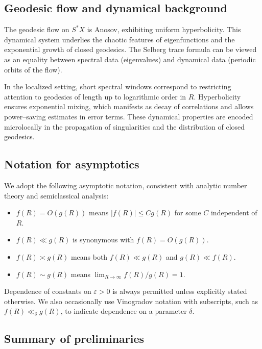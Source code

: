 \subsection{Geodesic flow and dynamical background}\label{subsec:flow}

The geodesic flow on $S^*X$ is Anosov, exhibiting uniform hyperbolicity. This dynamical system underlies the chaotic features of eigenfunctions and the exponential growth of closed geodesics. The Selberg trace formula can be viewed as an equality between spectral data (eigenvalues) and dynamical data (periodic orbits of the flow).

In the localized setting, short spectral windows correspond to restricting attention to geodesics of length up to logarithmic order in $R$. Hyperbolicity ensures exponential mixing, which manifests as decay of correlations and allows power–saving estimates in error terms. These dynamical properties are encoded microlocally in the propagation of singularities and the distribution of closed geodesics.

\subsection{Notation for asymptotics}\label{subsec:asymptotics}

We adopt the following asymptotic notation, consistent with analytic number theory and semiclassical analysis:

\begin{itemize}
  \item $f(R) = O(g(R))$ means $|f(R)| \le C g(R)$ for some $C$ independent of $R$.
  \item $f(R) \ll g(R)$ is synonymous with $f(R)=O(g(R))$.
  \item $f(R) \asymp g(R)$ means both $f(R) \ll g(R)$ and $g(R) \ll f(R)$.
  \item $f(R) \sim g(R)$ means $\lim_{R\to\infty} f(R)/g(R)=1$.
\end{itemize}

Dependence of constants on $\varepsilon>0$ is always permitted unless explicitly stated otherwise. We also occasionally use Vinogradov notation with subscripts, such as $f(R) \ll_\delta g(R)$, to indicate dependence on a parameter $\delta$.

\subsection{Summary of preliminaries}\label{subsec:prelim-summary}

